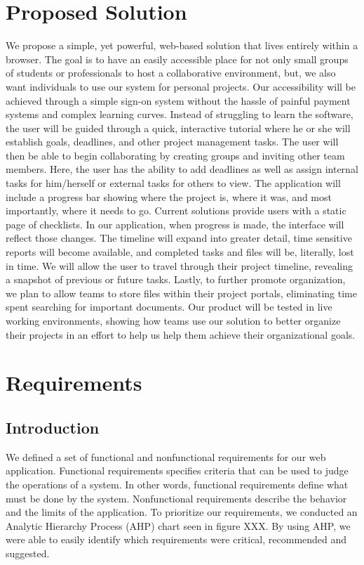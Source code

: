 \section{Proposed Solution}

We propose a simple, yet powerful, web-based solution that lives entirely within a browser. The goal is to have an easily accessible place for not only small groups of students or professionals to host a collaborative environment, but, we also want individuals to use our system for personal projects. Our accessibility will be achieved through a simple sign-on system without the hassle of painful payment systems and complex learning curves. Instead of struggling to learn the software, the user will be guided through a quick, interactive tutorial where he or she will establish goals, deadlines, and other project management tasks. The user will then be able to begin collaborating by creating groups and inviting other team members. Here, the user has the ability to add deadlines as well as assign internal tasks for him/herself or external tasks for others to view. The application will include a progress bar showing where the project is, where it was, and most importantly, where it needs to go. Current solutions provide users with a static page of checklists. In our application, when progress is made, the interface will reflect those changes. The timeline will expand into greater detail, time sensitive reports will become available, and completed tasks and files will be, literally, lost in time.  We will allow the user to travel through their project timeline, revealing a snapshot of previous or future tasks. Lastly, to further promote organization, we plan to allow teams to store files within their project portals, eliminating time spent searching for important documents. Our product will be tested in live working environments, showing how teams use our solution to better organize their projects in an effort to help us help them achieve their organizational goals. 

\section{Requirements}
\subsection{Introduction}
We defined a set of functional and nonfunctional requirements for our web application. Functional requirements specifies criteria that can be used to judge the operations of a system. In other words, functional requirements define what must be done by the system. Nonfunctional requirements describe the behavior and the limits of the application. To prioritize our requirements, we conducted an Analytic Hierarchy Process (AHP) chart seen in figure XXX. By using AHP, we were able to easily identify which requirements were critical, recommended and suggested. 
